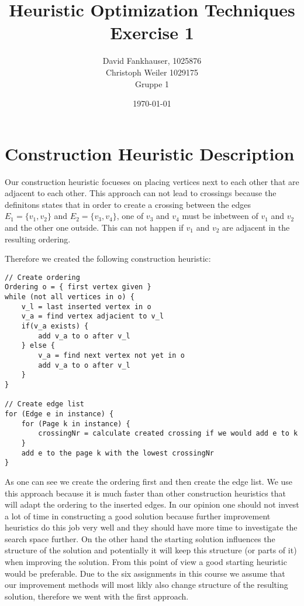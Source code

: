 \documentclass[11pt]{article}
\title{\textbf{Heuristic Optimization Techniques }\\Exercise 1}
\author{David Fankhauser, 1025876\\ Christoph Weiler 1029175\\Gruppe 1}
\date{\today}
\begin{document}
\lstset{language=C++}
\maketitle
 
\section{Construction Heuristic Description}
Our construction heuristic focueses on placing vertices next to each other that are adjacent to each other.
This approach can not lead to crossings because the definitons states that in order to create a crossing between the edges $E_1 = \lbrace v_1, v_2 \rbrace$ and $E_2 = \lbrace v_3, v_4 \rbrace$, one of $v_3$ and $v_4$ must be inbetween of $v_1$ and $v_2$ and the other one outside.
This can not happen if $v_1$ and $v_2$ are adjacent in the resulting ordering.

Therefore we created the following construction heuristic:
\begin{lstlisting}[frame=single]
// Create ordering
Ordering o = { first vertex given }
while (not all vertices in o) {
    v_l = last inserted vertex in o
    v_a = find vertex adjacient to v_l
    if(v_a exists) {
    	add v_a to o after v_l
    } else {
    	v_a = find next vertex not yet in o
        add v_a to o after v_l
    }
}

// Create edge list
for (Edge e in instance) {
    for (Page k in instance) {
        crossingNr = calculate created crossing if we would add e to k
    }
    add e to the page k with the lowest crossingNr
}
\end{lstlisting}

As one can see we create the ordering first and then create the edge list.
We use this approach because it is much faster than other construction heuristics that will adapt the ordering to the inserted edges.
In our opinion one should not invest a lot of time in constructing a good solution because further improvement heuristics do this job very well and they should have more time to investigate the search space further.
On the other hand the starting solution influences the structure of the solution and potentially it will keep this structure (or parts of it) when improving the solution. From this point of view a good starting heuristic would be preferable.
Due to the six assignments in this course we assume that our improvement methods will most likly also change structure of the resulting solution, therefore we went with the first approach.
\end{document}
